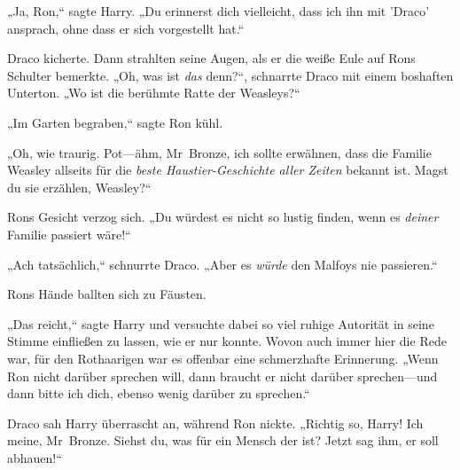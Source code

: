„Ja, Ron,“ sagte Harry. „Du erinnerst dich vielleicht, dass ich ihn mit 'Draco' ansprach, ohne dass er sich vorgestellt hat.“

Draco kicherte. Dann strahlten seine Augen, als er die weiße Eule auf Rons Schulter bemerkte. „Oh, was ist \emph{das} denn?“, schnarrte Draco mit einem boshaften Unterton. „Wo ist die berühmte Ratte der Weasleys?“

„Im Garten begraben,“ sagte Ron kühl.

„Oh, wie traurig. Pot—ähm, Mr~Bronze, ich sollte erwähnen, dass die Familie Weasley allseits für die \emph{beste Haustier-Geschichte aller Zeiten} bekannt ist. Magst du sie erzählen, Weasley?“

Rons Gesicht verzog sich. „Du würdest es nicht so lustig finden, wenn es \emph{deiner} Familie passiert wäre!“

„Ach tatsächlich,“ schnurrte Draco. „Aber es \emph{würde} den Malfoys nie passieren.“

Rons Hände ballten sich zu Fäusten.

„Das reicht,“ sagte Harry und versuchte dabei so viel ruhige Autorität in seine Stimme einfließen zu lassen, wie er nur konnte. Wovon auch immer hier die Rede war, für den Rothaarigen war es offenbar eine schmerzhafte Erinnerung. „Wenn Ron nicht darüber sprechen will, dann braucht er nicht darüber sprechen—und dann bitte ich dich, ebenso wenig darüber zu sprechen.“

Draco sah Harry überrascht an, während Ron nickte. „Richtig so, Harry! Ich meine, Mr~Bronze. Siehst du, was für ein Mensch der ist? Jetzt sag ihm, er soll abhauen!“

